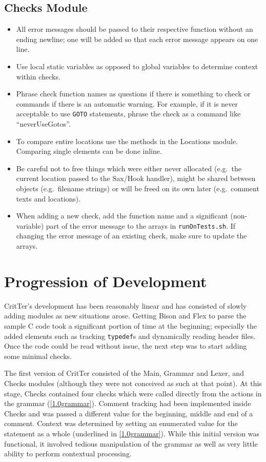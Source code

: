 \documentclass[12pt]{report}
\newcommand{\programName}{CritTer\xspace}
\begin{document}
\section{Checks Module}

\begin{itemize}
\item All error messages should be passed to their respective function without an ending newline; one 
will be added so that each error message appears on one line.
\item Use local static variables as opposed to global variables to determine context within checks.
\item Phrase check function names as questions if there is something to check or commands if there is an automatic warning. For example, if it is never acceptable to use \lstinline{GOTO} statements, phrase the check as a command like ``neverUseGotos''.
\item To compare entire locations use the methods in the Locations module. Comparing single elements can be done inline. 
\item Be careful not to free things which were either never allocated (e.g.\ the current location passed to the Sax\slash Hook handler), might be shared between objects (e.g.\ filename strings) or will be freed on its own later (e.g.\ comment texts and locations).
\item When adding a new check, add the function name and a significant (non-variable) part of the error message to the arrays in \lstinline{runOnTests.sh}. If changing the error message of an existing check, make sure to update the arrays.
\end{itemize}

\chapter{Progression of Development}
\label{progressionOfDevelopment}

\programName's development has been reasonably linear and has consisted of slowly adding modules 
as new situations arose. Getting Bison and Flex to parse the sample C code took a significant portion of 
time at the beginning; especially the added elements such as tracking \lstinline{typedef}s and 
dynamically reading header files. Once the code could be read without issue, the next step was to start 
adding some minimal checks.

The first version of \programName consisted of the Main, Grammar and Lexer, and Checks modules 
(although they were not conceived as such at that point). At this stage, Checks contained four checks 
which were called directly from the actions in the grammar (\autoref{1.0grammar}). Comment tracking 
had been implemented inside Checks and was passed a different value for the beginning, middle and 
end of a comment. Context was determined by setting an enumerated value for the statement as a whole 
(underlined in \autoref{1.0grammar}). While this initial version was functional, it involved tedious 
manipulation of the grammar as well as very little ability to perform contextual processing.
\end{document}
